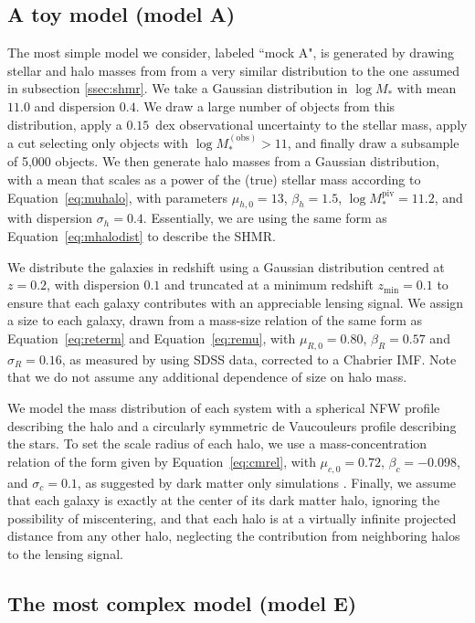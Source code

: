\documentclass[usenatbib]{mnras}
\def\mobs{M_*^{\mathrm{(obs)}}}
\def\mstar{M_*}
\def\mpiv{M_*^{\mathrm{piv}}}
\def\Eref#1{Equation~\ref{#1}\xspace}
\begin{document}
\subsection{A toy model (model A)}\label{ssec:mockA}

The most simple model we consider, labeled ``mock A", is generated by drawing stellar and halo masses from 
 from a very similar distribution to the one assumed in subsection \ref{ssec:shmr}. 
We take a Gaussian distribution in $\log{\mstar}$ with mean $11.0$ and dispersion $0.4$. We draw a large number of objects from this distribution, apply a $0.15$~dex observational uncertainty to the stellar mass, apply a cut selecting only objects with $\log{\mobs} > 11$, and finally draw a subsample of 5,000 objects. We then generate halo masses from a Gaussian distribution, with a mean that scales as a power of the (true) stellar mass according to \Eref{eq:muhalo}, with parameters $\mu_{h,0} = 13$, $\beta_h=1.5$, $\log{\mpiv}=11.2$, and with dispersion $\sigma_h=0.4$. Essentially, we are using the same form as \Eref{eq:mhalodist} to describe the SHMR.

We distribute the galaxies in redshift using a Gaussian distribution centred at $z=0.2$, with dispersion $0.1$ and truncated at a minimum redshift $z_{\mathrm{min}}=0.1$ to ensure that each galaxy contributes with an appreciable lensing signal.
We assign a size to each galaxy, drawn from a mass-size relation of the same form as \Eref{eq:reterm} and \Eref{eq:remu}, with $\mu_{R,0}=0.80$, $\beta_R=0.57$ and $\sigma_R=0.16$, as measured by \citet{New++12} using SDSS data, corrected to a Chabrier IMF.
Note that we do not assume any additional dependence of size on halo mass.

We model the mass distribution of each system with a spherical NFW profile describing the halo and a circularly symmetric de Vaucouleurs profile describing the stars. 
To set the scale radius of each halo, we use a mass-concentration relation of the form given by \Eref{eq:cmrel}, with $\mu_{c,0} = 0.72$, $\beta_c = -0.098$, and $\sigma_c = 0.1$, as suggested by dark matter only simulations \citep[see e.g.][]{Mac++08}.
Finally, we assume that each galaxy is exactly at the center of its dark matter halo, ignoring the possibility of miscentering, and that each halo is at a virtually infinite projected distance from any other halo, neglecting the contribution from neighboring halos to the lensing signal.

\subsection{The most complex model (model E)}\label{ssec:mockE}
\end{document}
